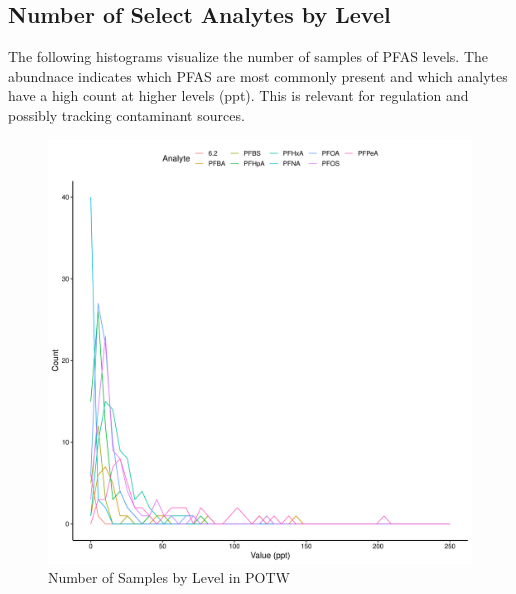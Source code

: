 \documentclass[
  12pt,
]{article}
\begin{document}
\hypertarget{number-of-select-analytes-by-level}{%
\subsection{Number of Select Analytes by
Level}\label{number-of-select-analytes-by-level}}

The following histograms visualize the number of samples of PFAS levels.
The abundnace indicates which PFAS are most commonly present and which
analytes have a high count at higher levels (ppt). This is relevant for
regulation and possibly tracking contaminant sources.

\begin{figure}

\includegraphics{PFAS_FinalProject_files/figure-latex/unnamed-chunk-4-1} \hfill{}

\caption{Number of Samples by Level in POTW}\label{fig:unnamed-chunk-4}
\end{figure}
\end{document}
